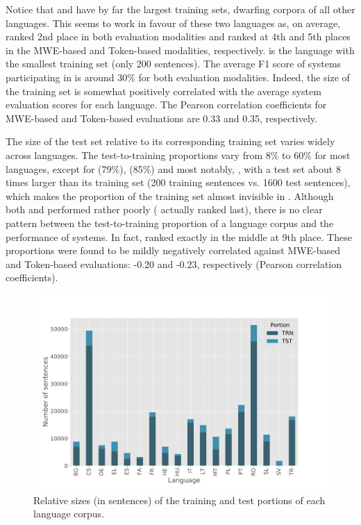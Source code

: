 \documentclass[output=paper,modfonts,nonflat,draftmode]{langsci/langscibook}
\begin{document}
Notice that  and  have by far the largest training sets, dwarfing corpora of all other languages. This seems to work in favour of these two languages as, on average,  ranked 2nd place in both evaluation modalities and  ranked at 4th and 5th places in the MWE-based and Token-based modalities, respectively.  is the language with the smallest training set (only 200 sentences). The average F1 score of systems participating in  is around 30\% for both evaluation modalities. Indeed, the size of the training set is somewhat positively correlated with the average system evaluation scores for each language. The Pearson correlation coefficients for MWE-based and Token-based evaluations are 0.33 and 0.35, respectively.

The size of the test set relative to its corresponding training set varies widely across languages. The test-to-training proportions vary from 8\% to 60\% for most languages, except for  (79\%),  (85\%) and most notably, , with a test set about 8 times larger than its training set (200 training sentences vs. 1600 test sentences), which makes the proportion of the training set almost invisible in . Although both  and  performed rather poorly ( actually ranked last), there is no clear pattern between the test-to-training proportion of a language corpus and the performance of systems. In fact,  ranked exactly in the middle at 9th place. These proportions were found to be mildly negatively correlated against MWE-based and Token-based evaluations: -0.20 and -0.23, respectively (Pearson correlation coefficients).

\begin{figure}
\includegraphics[scale=0.41]{figures/langcorpora-sizes-sents.pdf}
\caption{\label{fig:langcorp-sizes} Relative sizes (in sentences) of the training and test portions of each language corpus.}
\end{figure}
\end{document}
